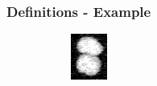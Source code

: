 \begin{frame}
    \frametitle{Definitions - Example}
    \begin{figure}
        \centering
        \begin{subfigure}[t]{0.23\textwidth}
            \centering
            \includegraphics[width=\textwidth]{images/joint/overseg/75/02/raw_contrast.png}
        \end{subfigure}
        ~
        \begin{subfigure}[t]{0.23\textwidth}
            \centering
            

\end{subfigure}
\end{figure}
\end{frame}
